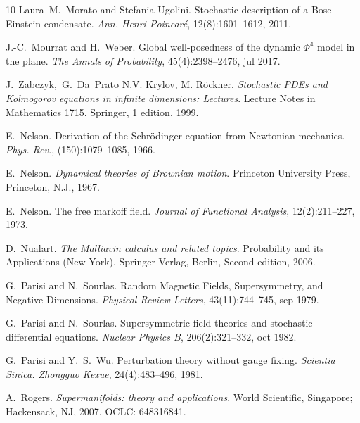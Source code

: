 \documentclass[a4paper,10pt]{article}
\newcommand{\tmtextit}[1]{{\itshape{#1}}}
\begin{document}
\begin{thebibliography}{10}
  Laura~M.~Morato  and  Stefania Ugolini.
  {\newblock}Stochastic description of a Bose-Einstein condensate.
  {\newblock}\tmtextit{Ann. Henri Poincar{\'e}}, 12(8):1601--1612,
  2011.{\newblock}
  
  J.-C.~Mourrat  and  H.~Weber. {\newblock}Global
  well-posedness of the dynamic $\Phi^4$ model in the plane.
  {\newblock}\tmtextit{The Annals of Probability}, 45(4):2398--2476, jul
  2017.{\newblock}
  
  J.~Zabczyk,~G.~Da~Prato N.V. Krylov, M.
  R{\"o}ckner. {\newblock}\tmtextit{Stochastic PDEs and Kolmogorov equations
  in infinite dimensions: Lectures}. {\newblock}Lecture Notes in Mathematics
  1715. Springer, 1  edition, 1999.{\newblock}
  
  E.~Nelson. {\newblock}Derivation of the
  Schr{\"o}dinger equation from Newtonian mechanics.
  {\newblock}\tmtextit{Phys. Rev.}, (150):1079--1085, 1966.{\newblock}
  
  E.~Nelson. {\newblock}\tmtextit{Dynamical theories of
  Brownian motion}. {\newblock}Princeton University Press, Princeton, N.J.,
  1967.{\newblock}
  
  E.~Nelson. {\newblock}The free markoff field.
  {\newblock}\tmtextit{Journal of Functional Analysis}, 12(2):211--227,
  1973.{\newblock}
  
  D.~Nualart. {\newblock}\tmtextit{The Malliavin
  calculus and related topics}. {\newblock}Probability and its Applications
  (New York). Springer-Verlag, Berlin, Second  edition, 2006.{\newblock}
  
  G.~Parisi  and  N.~Sourlas.
  {\newblock}Random Magnetic Fields, Supersymmetry, and Negative Dimensions.
  {\newblock}\tmtextit{Physical Review Letters}, 43(11):744--745, sep
  1979.{\newblock}
  
  G.~Parisi  and  N.~Sourlas.
  {\newblock}Supersymmetric field theories and stochastic differential
  equations. {\newblock}\tmtextit{Nuclear Physics B}, 206(2):321--332, oct
  1982.{\newblock}
  
  G.~Parisi  and  Y.~S.~Wu.
  {\newblock}Perturbation theory without gauge fixing.
  {\newblock}\tmtextit{Scientia Sinica. Zhongguo Kexue}, 24(4):483--496,
  1981.{\newblock}
  
  A.~Rogers.
  {\newblock}\tmtextit{Supermanifolds: theory and applications}.
  {\newblock}World Scientific, Singapore; Hackensack, NJ, 2007.
  {\newblock}OCLC: 648316841.{\newblock}
  

\end{thebibliography}
\end{document}
